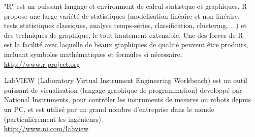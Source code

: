 	{\Large {}}{\Large {}}{\Large {}} "R" est un puissant langage et environment de calcul statistque et graphiques. R propose une large variété de statistiques (modélisation linéaire et non-linéaire, tests statistiques classiques, analyse temps-séries, classification, clustering, ...) et des techniques de graphique, le tout hautement extensible. Une des forces de R est la facilité avec laquelle de beaux graphiques de qualité peuvent être produits, incluant symboles mathématiques et formules si nécessaire.\\
	\href{http://www.r-project.org}{\color{blue}http://www.r-project.org}
	
	{\Large {}}{\Large {}} LabVIEW (Laboratory Virtual Instrument Engineering Workbench) est un outil puissant de visualisation (langage graphique de programmation) developpé par National Instruments, pour contrôler les instruments de mesures ou robots depuis un PC, et est utilisé par un grand nombre d'entreprise dans le monde (particulièrement les ingénieurs).\\
	\href{http://www.ni.com/labview}{\color{blue}http://www.ni.com/labview}
